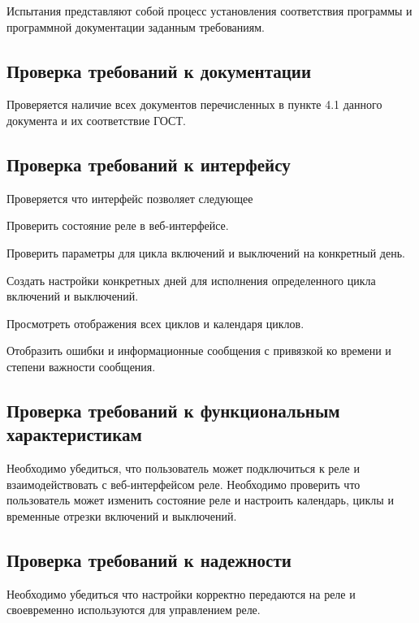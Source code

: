 Испытания представляют собой процесс установления соответствия программы и
программной документации заданным требованиям.

\subsection{Проверка требований к документации}
Проверяется наличие всех документов перечисленных в пункте 4.1 данного документа и их соответствие ГОСТ.

\subsection{Проверка требований к интерфейсу}
Проверяется что интерфейс позволяет следующее
\begin{my_enumerate}
\item Проверить состояние реле в веб-интерфейсе.
\item Проверить параметры для цикла включений и выключений на конкретный день.
\item Создать настройки конкретных дней для исполнения определенного цикла включений и выключений.
\item Просмотреть отображения всех циклов и календаря циклов.
\item Отобразить ошибки и информационные сообщения с привязкой ко времени и степени важности сообщения.
\end{my_enumerate}


\subsection{Проверка требований к функциональным характеристикам}
Необходимо убедиться, что пользователь может подключиться к реле и взаимодействовать с веб-интерфейсом реле. Необходимо проверить что пользователь может изменить состояние реле и настроить календарь, циклы и временные отрезки включений и выключений.


\subsection{Проверка требований к надежности}
Необходимо убедиться что настройки корректно передаются на реле и своевременно используются для управлением реле.